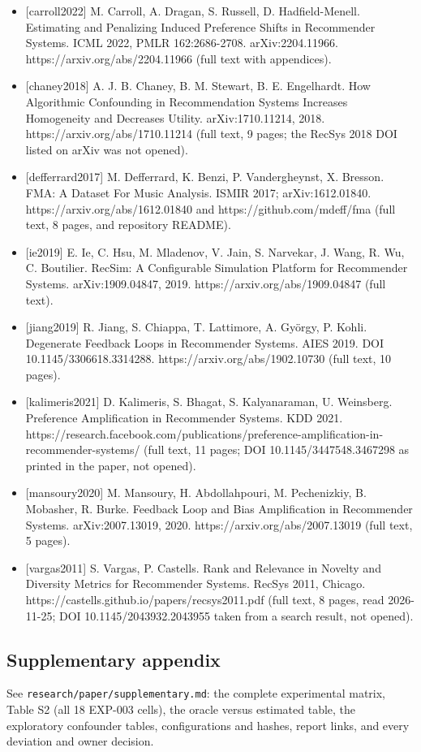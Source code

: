 \documentclass[
]{article}
\providecommand{\tightlist}{%
  \setlength{\itemsep}{0pt}\setlength{\parskip}{0pt}}
\begin{document}
\begin{itemize}
\tightlist
\item
  {[}carroll2022{]} M. Carroll, A. Dragan, S. Russell, D.
  Hadfield-Menell. Estimating and Penalizing Induced Preference Shifts
  in Recommender Systems. ICML 2022, PMLR 162:2686-2708.
  arXiv:2204.11966. https://arxiv.org/abs/2204.11966 (full text with
  appendices).
\item
  {[}chaney2018{]} A. J. B. Chaney, B. M. Stewart, B. E. Engelhardt. How
  Algorithmic Confounding in Recommendation Systems Increases
  Homogeneity and Decreases Utility. arXiv:1710.11214, 2018.
  https://arxiv.org/abs/1710.11214 (full text, 9 pages; the RecSys 2018
  DOI listed on arXiv was not opened).
\item
  {[}defferrard2017{]} M. Defferrard, K. Benzi, P. Vandergheynst, X.
  Bresson. FMA: A Dataset For Music Analysis. ISMIR 2017;
  arXiv:1612.01840. https://arxiv.org/abs/1612.01840 and
  https://github.com/mdeff/fma (full text, 8 pages, and repository
  README).
\item
  {[}ie2019{]} E. Ie, C. Hsu, M. Mladenov, V. Jain, S. Narvekar, J.
  Wang, R. Wu, C. Boutilier. RecSim: A Configurable Simulation Platform
  for Recommender Systems. arXiv:1909.04847, 2019.
  https://arxiv.org/abs/1909.04847 (full text).
\item
  {[}jiang2019{]} R. Jiang, S. Chiappa, T. Lattimore, A. György, P.
  Kohli. Degenerate Feedback Loops in Recommender Systems. AIES 2019.
  DOI 10.1145/3306618.3314288. https://arxiv.org/abs/1902.10730 (full
  text, 10 pages).
\item
  {[}kalimeris2021{]} D. Kalimeris, S. Bhagat, S. Kalyanaraman, U.
  Weinsberg. Preference Amplification in Recommender Systems. KDD 2021.
  https://research.facebook.com/publications/preference-amplification-in-recommender-systems/
  (full text, 11 pages; DOI 10.1145/3447548.3467298 as printed in the
  paper, not opened).
\item
  {[}mansoury2020{]} M. Mansoury, H. Abdollahpouri, M. Pechenizkiy, B.
  Mobasher, R. Burke. Feedback Loop and Bias Amplification in
  Recommender Systems. arXiv:2007.13019, 2020.
  https://arxiv.org/abs/2007.13019 (full text, 5 pages).
\item
  {[}vargas2011{]} S. Vargas, P. Castells. Rank and Relevance in Novelty
  and Diversity Metrics for Recommender Systems. RecSys 2011, Chicago.
  https://castells.github.io/papers/recsys2011.pdf (full text, 8 pages,
  read 2026-11-25; DOI 10.1145/2043932.2043955 taken from a search
  result, not opened).
\end{itemize}

\subsection{Supplementary appendix}\label{supplementary-appendix}

See \texttt{research/paper/supplementary.md}: the complete experimental
matrix, Table S2 (all 18 EXP-003 cells), the oracle versus estimated
table, the exploratory confounder tables, configurations and hashes,
report links, and every deviation and owner decision.
\end{document}
